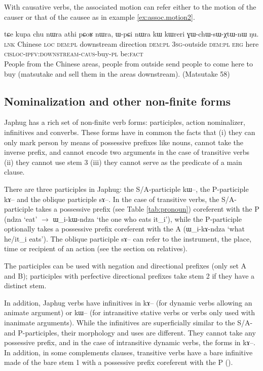 \documentclass[oldfontcommands,oneside,a4paper,11pt]{article}
\newcommand{\ipa}[1]{{\phon #1}} %
\begin{document}
With causative verbs, the associated motion can refer either to the motion of the causer or that of the causee as in example \ref{ex:assoc.motion2}.

  \begin{exe}
\ex \label{ex:assoc.motion2}
\gll
\ipa{tɕe} 	\ipa{kupa} 	\ipa{chu} 	\ipa{nɯra} 	\ipa{athi} 	\ipa{pɕoʁ} 	\ipa{nɯra,} 	\ipa{ɯ-pɕi} 	\ipa{nɯra} 	\ipa{kɯ} 	\ipa{kɯreri} 	\ipa{ɣɯ-chɯ-sɯ-χtɯ-nɯ} 	\ipa{ŋu.}  \\
\textsc{lnk} Chinese \textsc{loc} \textsc{dem:pl} downstream direction \textsc{dem:pl} \textsc{3sg}-outside  \textsc{dem:pl}  \textsc{erg} here \textsc{cisloc-ipfv:downstream-caus}-buy-\textsc{pl} be:\textsc{fact} \\
\glt People from the Chinese areas, people from outside send people to come here to buy (matsutake and sell them in the areas downstream). (Matsutake 58)
  \end{exe} 


\subsection{Nominalization and other non-finite forms}

Japhug has a rich set of non-finite verb forms: participles, action nominalizer, infinitives and converbs. These forms have in common the facts that (i) they can only mark person by means of possessive prefixes like nouns, cannot take the inverse prefix, and cannot encode two arguments in the case of transitive verbs (ii) they cannot use stem 3 (iii) they cannot serve as the predicate of a main clause.

There are three participles in Japhug: the S/A-participle \ipa{kɯ--}, the P-participle \ipa{kɤ--} and the oblique participle \ipa{sɤ--}. In the case of transitive verbs, the S/A-participle takes a possessive prefix (see Table \ref{tab:pronoun}) coreferent with the P (\ipa{ndza} `eat' $\rightarrow$ \ipa{ɯ_i-kɯ-ndza} `the one who eats it_i'), while the P-participle optionally takes a possessive prefix coreferent with the A (\ipa{ɯ_i-kɤ-ndza} `what he/it_i eats'). The oblique participle \ipa{sɤ--} can refer to  the instrument, the place, time or recipient of an action (see the section on relatives).

The participles can be used with negation and directional prefixes (only set A and B); participles with perfective directional prefixes take stem 2 if they have a distinct stem.

In addition, Japhug verbs have infinitives in \ipa{kɤ--} (for dynamic verbs allowing an animate argument) or \ipa{kɯ--} (for intransitive stative verbs or verbs only used with inanimate arguments). While the infinitives are superficially similar to the S/A- and P-participles, their morphology and uses are different. They cannot take any possessive prefix, and in the case of intransitive dynamic verbs, the forms in \ipa{kɤ--}. In addition, in some complements clauses, transitive verbs have a bare infinitive made of the bare stem 1 with a possessive prefix coreferent with the P (\citealt{jacques14antipassive}).
\end{document}

